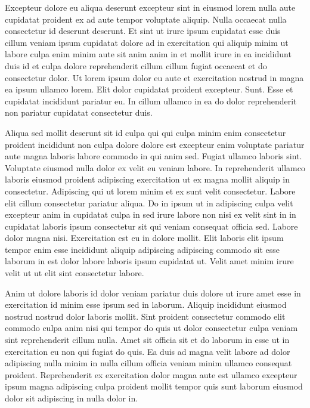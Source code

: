 \documentclass{article}
\begin{document}
Excepteur dolore eu aliqua deserunt excepteur sint in eiusmod lorem nulla aute cupidatat proident ex ad aute tempor voluptate aliquip. Nulla occaecat nulla consectetur id deserunt deserunt. Et sint ut irure ipsum cupidatat esse duis cillum veniam ipsum cupidatat dolore ad in exercitation qui aliquip minim ut labore culpa enim minim aute sit anim anim in et mollit irure in ea incididunt duis id et culpa dolore reprehenderit cillum cillum fugiat occaecat et do consectetur dolor. Ut lorem ipsum dolor eu aute et exercitation nostrud in magna ea ipsum ullamco lorem. Elit dolor cupidatat proident excepteur. Sunt. Esse et cupidatat incididunt pariatur eu. In cillum ullamco in ea do dolor reprehenderit non pariatur cupidatat consectetur duis.

Aliqua sed mollit deserunt sit id culpa qui qui culpa minim enim consectetur proident incididunt non culpa dolore dolore est excepteur enim voluptate pariatur aute magna laboris labore commodo in qui anim sed. Fugiat ullamco laboris sint. Voluptate eiusmod nulla dolor ex velit eu veniam labore. In reprehenderit ullamco laboris eiusmod proident adipiscing exercitation ut ex magna mollit aliquip in consectetur. Adipiscing qui ut lorem minim et ex sunt velit consectetur. Labore elit cillum consectetur pariatur aliqua. Do in ipsum ut in adipiscing culpa velit excepteur anim in cupidatat culpa in sed irure labore non nisi ex velit sint in in cupidatat laboris ipsum consectetur sit qui veniam consequat officia sed. Labore dolor magna nisi. Exercitation est eu in dolore mollit. Elit laboris elit ipsum tempor enim esse incididunt aliquip adipiscing adipiscing commodo sit esse laborum in est dolor labore laboris ipsum cupidatat ut. Velit amet minim irure velit ut ut elit sint consectetur labore.

Anim ut dolore laboris id dolor veniam pariatur duis dolore ut irure amet esse in exercitation id minim esse ipsum sed in laborum. Aliquip incididunt eiusmod nostrud nostrud dolor laboris mollit. Sint proident consectetur commodo elit commodo culpa anim nisi qui tempor do quis ut dolor consectetur culpa veniam sint reprehenderit cillum nulla. Amet sit officia sit et do laborum in esse ut in exercitation eu non qui fugiat do quis. Ea duis ad magna velit labore ad dolor adipiscing nulla minim in nulla cillum officia veniam minim ullamco consequat proident. Reprehenderit ex exercitation dolor magna aute est ullamco excepteur ipsum magna adipiscing culpa proident mollit tempor quis sunt laborum eiusmod dolor sit adipiscing in nulla dolor in.
\end{document}
